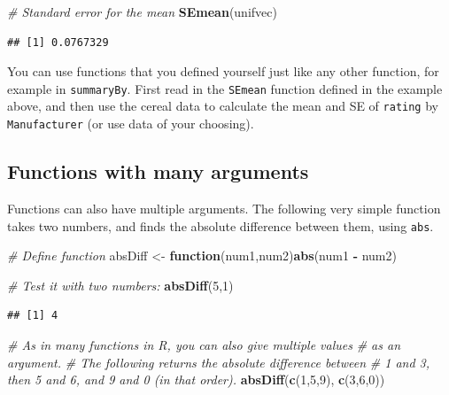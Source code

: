 \documentclass[]{book}
\newenvironment{Shaded}{\begin{snugshade}}{\end{snugshade}}
\newcommand{\CommentTok}[1]{\textcolor[rgb]{0.56,0.35,0.01}{\textit{#1}}}
\newcommand{\ControlFlowTok}[1]{\textcolor[rgb]{0.13,0.29,0.53}{\textbf{#1}}}
\newcommand{\DecValTok}[1]{\textcolor[rgb]{0.00,0.00,0.81}{#1}}
\newcommand{\KeywordTok}[1]{\textcolor[rgb]{0.13,0.29,0.53}{\textbf{#1}}}
\newcommand{\NormalTok}[1]{#1}
\newcommand{\OperatorTok}[1]{\textcolor[rgb]{0.81,0.36,0.00}{\textbf{#1}}}
\newcommand{\StringTok}[1]{\textcolor[rgb]{0.31,0.60,0.02}{#1}}
\let\BeginKnitrBlock\begin \let\EndKnitrBlock\end
\begin{document}
\begin{Shaded}
\begin{Highlighting}[]
\CommentTok{# Standard error for the mean}
\KeywordTok{SEmean}\NormalTok{(unifvec)}
\end{Highlighting}
\end{Shaded}

\begin{verbatim}
## [1] 0.0767329
\end{verbatim}

\BeginKnitrBlock{rmdtry}
You can use functions that you defined yourself just like any other function, for example in \texttt{summaryBy}. First read in the \texttt{SEmean} function defined in the example above, and then use the cereal data to calculate the mean and SE of \texttt{rating} by \texttt{Manufacturer} (or use data of your choosing).
\EndKnitrBlock{rmdtry}

\hypertarget{functions-with-many-arguments}{%
\subsection{Functions with many arguments}\label{functions-with-many-arguments}}

Functions can also have multiple arguments. The following very simple function takes two numbers, and finds the absolute difference between them, using \texttt{abs}.

\begin{Shaded}
\begin{Highlighting}[]
\CommentTok{# Define function}
\NormalTok{absDiff <-}\StringTok{ }\ControlFlowTok{function}\NormalTok{(num1,num2)}\KeywordTok{abs}\NormalTok{(num1 }\OperatorTok{-}\StringTok{ }\NormalTok{num2)}

\CommentTok{# Test it with two numbers:}
\KeywordTok{absDiff}\NormalTok{(}\DecValTok{5}\NormalTok{,}\DecValTok{1}\NormalTok{)}
\end{Highlighting}
\end{Shaded}

\begin{verbatim}
## [1] 4
\end{verbatim}

\begin{Shaded}
\begin{Highlighting}[]
\CommentTok{# As in many functions in R, you can also give multiple values}
\CommentTok{# as an argument.}
\CommentTok{# The following returns the absolute difference between }
\CommentTok{# 1 and 3, then 5 and 6, and 9 and 0 (in that order).}
\KeywordTok{absDiff}\NormalTok{(}\KeywordTok{c}\NormalTok{(}\DecValTok{1}\NormalTok{,}\DecValTok{5}\NormalTok{,}\DecValTok{9}\NormalTok{), }\KeywordTok{c}\NormalTok{(}\DecValTok{3}\NormalTok{,}\DecValTok{6}\NormalTok{,}\DecValTok{0}\NormalTok{))}
\end{Highlighting}
\end{Shaded}
\end{document}

